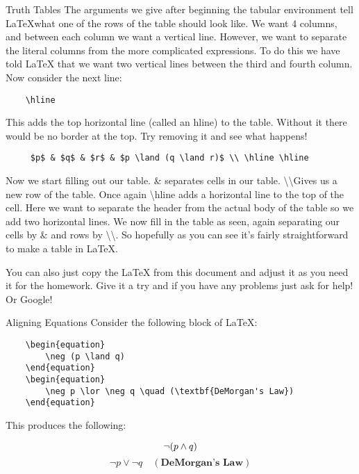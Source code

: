 \documentclass{article}
\begin{document}
\begin{section}{Truth Tables}
\noindent The arguments we give after beginning the tabular environment tell \LaTeX what one of the rows of the table should look like. We want 4 columns, and between each column we want a vertical line. However, we want to separate the literal columns from the more complicated expressions. To do this we have told \LaTeX{} that we want two vertical lines between the third and fourth column. Now consider the next line:

\begin{verbatim}
    \hline
\end{verbatim}

\noindent This adds the top horizontal line (called an hline) to the table. Without it there would be no border at the top. Try removing it and see what happens!

\begin{verbatim}
     $p$ & $q$ & $r$ & $p \land (q \land r)$ \\ \hline \hline
\end{verbatim}

\noindent Now we start filling out our table. \& separates cells in our table. \textbackslash \textbackslash \space Gives us a new row of the table. Once again \textbackslash hline adds a horizontal line to the top of the cell. Here we want to separate the header from the actual body of the table so we add two horizontal lines. We now fill in the table as seen, again separating our cells by $\&$ and rows by \textbackslash \textbackslash. So hopefully as you can see it's fairly straightforward to make a table in \LaTeX{}. \medskip

You can also just copy the \LaTeX{} from this document and adjust it as you need it for the homework. Give it a try and if you have any problems just ask for help! Or Google!

\end{section}

\begin{section}{Aligning Equations}
Consider the following block of \LaTeX{}:
\begin{verbatim}
    \begin{equation}
        \neg (p \land q)
    \end{equation}
    \begin{equation}
        \neg p \lor \neg q \quad (\textbf{DeMorgan's Law})
    \end{equation}
\end{verbatim}

\noindent This produces the following:

    \begin{equation}
        \neg (p \land q) \\
    \end{equation}
    \begin{equation}
        \neg p \lor \neg q \quad (\textbf{DeMorgan's Law})
    \end{equation}
\end{section}
\end{document}
